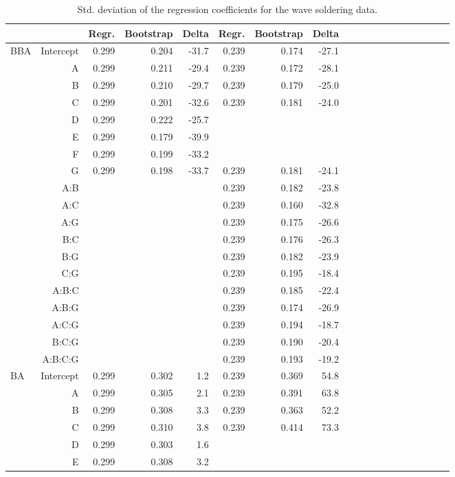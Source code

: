 \begin{table}
\centering
\caption{Std. deviation of the regression coefficients for the wave soldering data.}
\label{tbl:wavesoldering}
\begin{tabular}{lrrrrrrrrrrrrrrrrrr}
\toprule
 &  & Regr. & Bootstrap & Delta & Regr. & Bootstrap & Delta \\
\midrule
\multirow[c]{19}{*}{BBA} & Intercept & 0.299 & 0.204 & -31.7 & 0.239 & 0.174 & -27.1 \\
 & A & 0.299 & 0.211 & -29.4 & 0.239 & 0.172 & -28.1 \\
 & B & 0.299 & 0.210 & -29.7 & 0.239 & 0.179 & -25.0 \\
 & C & 0.299 & 0.201 & -32.6 & 0.239 & 0.181 & -24.0 \\
 & D & 0.299 & 0.222 & -25.7 &  &  &  \\
 & E & 0.299 & 0.179 & -39.9 &  &  &  \\
 & F & 0.299 & 0.199 & -33.2 &  &  &  \\
 & G & 0.299 & 0.198 & -33.7 & 0.239 & 0.181 & -24.1 \\
 & A:B &  &  &  & 0.239 & 0.182 & -23.8 \\
 & A:C &  &  &  & 0.239 & 0.160 & -32.8 \\
 & A:G &  &  &  & 0.239 & 0.175 & -26.6 \\
 & B:C &  &  &  & 0.239 & 0.176 & -26.3 \\
 & B:G &  &  &  & 0.239 & 0.182 & -23.9 \\
 & C:G &  &  &  & 0.239 & 0.195 & -18.4 \\
 & A:B:C &  &  &  & 0.239 & 0.185 & -22.4 \\
 & A:B:G &  &  &  & 0.239 & 0.174 & -26.9 \\
 & A:C:G &  &  &  & 0.239 & 0.194 & -18.7 \\
 & B:C:G &  &  &  & 0.239 & 0.190 & -20.4 \\
 & A:B:C:G &  &  &  & 0.239 & 0.193 & -19.2 \\
\multirow[c]{19}{*}{BA} & Intercept & 0.299 & 0.302 & 1.2 & 0.239 & 0.369 & 54.8 \\
 & A & 0.299 & 0.305 & 2.1 & 0.239 & 0.391 & 63.8 \\
 & B & 0.299 & 0.308 & 3.3 & 0.239 & 0.363 & 52.2 \\
 & C & 0.299 & 0.310 & 3.8 & 0.239 & 0.414 & 73.3 \\
 & D & 0.299 & 0.303 & 1.6 &  &  &  \\
 & E & 0.299 & 0.308 & 3.2 &  &  &  \\

\end{tabular}
\end{table}
